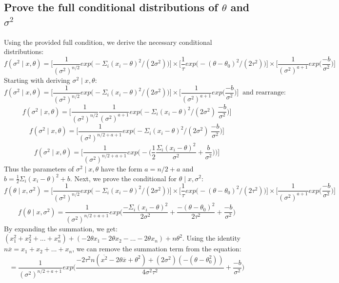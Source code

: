 \documentclass[20pt]{article} %
\begin{document}
\subsection{Prove the full conditional distributions of $\theta$ and $\sigma^{2}$}
Using the provided full condition, we derive the necessary conditional distributions:
$$f(\sigma^{2} \mid x, \theta) = \Bigg[ \frac{1}{(\sigma^{2})^{n/2}}exp\Bigg( -\Sigma_i (x_i - \theta)^{2} / (2\sigma^{2}) \Bigg) \Bigg] \times \Bigg[ \frac{1}{\tau} exp \Bigg( -(\theta - \theta_0)^{2} / (2\tau^{2}) \Bigg) \Bigg] \times \Bigg[ \frac{1}{(\sigma^{2})^{a+1}}exp\Bigg( \frac{-b}{\sigma^{2}} \Bigg) \Bigg]$$
Starting with deriving $\sigma^{2} \mid x, \theta$:
$$f(\sigma^{2} \mid x, \theta) = \Bigg[ \frac{1}{(\sigma^{2})^{n/2}}exp\Bigg( -\Sigma_i (x_i - \theta)^{2} / (2\sigma^{2}) \Bigg) \Bigg] \times \Bigg[ \frac{1}{(\sigma^{2})^{a+1}}exp\Bigg( \frac{-b}{\sigma^{2}} \Bigg) \Bigg] \ \text{ and rearrange:}$$
$$f(\sigma^{2} \mid x, \theta)= \Bigg[ \frac{1}{(\sigma^{2})^{n/2}} \frac{1}{(\sigma^{2})^{a+1}}exp\Bigg( -\Sigma_i (x_i - \theta)^{2} / (2\sigma^{2}) \ \frac{-b}{\sigma^{2}} \Bigg) \Bigg]$$
$$f(\sigma^{2} \mid x, \theta)= \Bigg[ \frac{1}{(\sigma^{2})^{n/2 + a + 1}} exp\Bigg( -\Sigma_i (x_i - \theta)^{2} / (2\sigma^{2}) \ \frac{-b}{\sigma^{2}} \Bigg) \Bigg]$$
$$f(\sigma^{2} \mid x, \theta)= \Bigg[ \frac{1}{(\sigma^{2})^{n/2 + a + 1}} exp\Bigg( - \Bigg( \frac{1}{2} \frac{\Sigma_i (x_i - \theta)^{2}}{\sigma^{2}} + \frac{b}{\sigma^{2}} \Bigg) \Bigg) \Bigg]$$
Thus the parameters of $\sigma^{2} \mid x, \theta$ have the form $a = n/2 + a$ and $b = \frac{1}{2} \Sigma_i (x_i - \theta)^{2} + b$. Next, we prove the conditional for $\theta \mid x, \sigma^{2}$:
$$f(\theta \mid x, \sigma^{2}) = \Bigg[ \frac{1}{(\sigma^{2})^{n/2}}exp\Bigg( -\Sigma_i (x_i - \theta)^{2} / (2\sigma^{2}) \Bigg) \Bigg] \times \Bigg[ \frac{1}{\tau} exp \Bigg( -(\theta - \theta_0)^{2} / (2\tau^{2}) \Bigg) \Bigg] \times \Bigg[ \frac{1}{(\sigma^{2})^{a+1}}exp\Bigg( \frac{-b}{\sigma^{2}} \Bigg) \Bigg]$$
$$f(\theta \mid x, \sigma^{2}) =  \frac{1}{(\sigma^{2})^{n/2 + a + 1}} exp \Bigg( \frac{-\Sigma_i (x_i - \theta)^{2}}{2\sigma^{2}} + \frac{-(\theta - \theta_0)^{2}}{2\tau^{2}}+\frac{-b}{\sigma^{2}} \Bigg)$$
By expanding the summation, we get: $(x_1^{2} + x_2^{2} + ... + x_n^{2}) + (-2\theta x_1 - 2\theta x_2 - ... - 2\theta x_n) + n\theta^{2}$.  Using the identity $n\overline{x} = x_1 + x_2 + ... + x_n$, we can remove the summation term from the equation:
$$=  \frac{1}{(\sigma^{2})^{n/2 + a + 1}} exp \Bigg( \frac{-2 \tau^{2} n ( \overline{x^{2}} - 2\theta \overline{x} + \theta^{2} ) + (2\sigma^{2})(-(\theta-\theta_0^{2}))}{4\sigma^{2}\tau^{2}} + \frac{-b}{\sigma^{2}} \Bigg)$$
\end{document}
